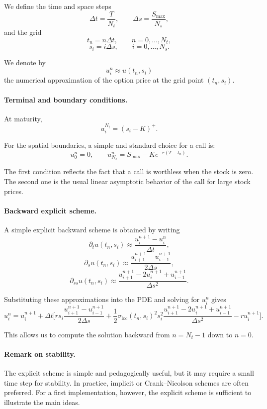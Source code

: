 \documentclass[11pt]{article}
\theoremstyle{plain}
\theoremstyle{definition}
\theoremstyle{remark}
\begin{document}
We define the time and space steps
\[
\Delta t=\frac{T}{N_t},
\qquad
\Delta s=\frac{S_{\max}}{N_s},
\]
and the grid
\[
t_n=n\Delta t,\qquad n=0,\dots,N_t,
\]
\[
s_i=i\Delta s,\qquad i=0,\dots,N_s.
\]

We denote by
\[
u_i^n \approx u(t_n,s_i)
\]
the numerical approximation of the option price at the grid point
\((t_n,s_i)\).

\paragraph{Terminal and boundary conditions.}
At maturity,
\[
u_i^{N_t}=(s_i-K)^+.
\]

For the spatial boundaries, a simple and standard choice for a call is:
\[
u_0^n=0,
\qquad
u_{N_s}^n=S_{\max}-Ke^{-r(T-t_n)}.
\]

The first condition reflects the fact that a call is worthless when the
stock is zero.
The second one is the usual linear asymptotic behavior of the call for
large stock prices.

\paragraph{Backward explicit scheme.}
A simple explicit backward scheme is obtained by writing
\[
\partial_t u(t_n,s_i)
\approx
\frac{u_i^{n+1}-u_i^n}{\Delta t},
\]
\[
\partial_s u(t_n,s_i)
\approx
\frac{u_{i+1}^{n+1}-u_{i-1}^{n+1}}{2\Delta s},
\]
\[
\partial_{ss}u(t_n,s_i)
\approx
\frac{u_{i+1}^{n+1}-2u_i^{n+1}+u_{i-1}^{n+1}}{\Delta s^2}.
\]

Substituting these approximations into the PDE and solving for \(u_i^n\)
gives
\[
u_i^n
=
u_i^{n+1}
+
\Delta t
\Bigg[
rs_i\frac{u_{i+1}^{n+1}-u_{i-1}^{n+1}}{2\Delta s}
+
\frac12 \sigma_{\mathrm{loc}}(t_n,s_i)^2 s_i^2
\frac{u_{i+1}^{n+1}-2u_i^{n+1}+u_{i-1}^{n+1}}{\Delta s^2}
-r u_i^{n+1}
\Bigg].
\]

This allows us to compute the solution backward from \(n=N_t-1\) down
to \(n=0\).

\paragraph{Remark on stability.}
The explicit scheme is simple and pedagogically useful, but it may
require a small time step for stability.
In practice, implicit or Crank--Nicolson schemes are often preferred.
For a first implementation, however, the explicit scheme is sufficient
to illustrate the main ideas.
\end{document}
